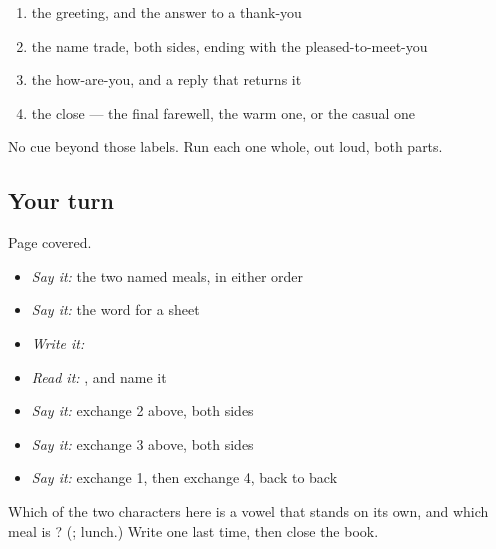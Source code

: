 \begin{enumerate}
\raggedright
  \item the greeting, and the answer to a thank-you
  \item the name trade, both sides, ending with the pleased-to-meet-you
  \item the how-are-you, and a reply that returns it
  \item the close — the final farewell, the warm one, or the casual one
\end{enumerate}

No cue beyond those labels. Run each one whole, out loud, both parts.

\subsection*{Your turn}
Page covered.

\begin{itemize}
\raggedright
  \item \emph{Say it:} the two named meals, in either order
  \item \emph{Say it:} the word for a sheet
  \item \emph{Write it:} \textbf{}
  \item \emph{Read it:} \textbf{}, and name it
  \item \emph{Say it:} exchange 2 above, both sides
  \item \emph{Say it:} exchange 3 above, both sides
  \item \emph{Say it:} exchange 1, then exchange 4, back to back
\end{itemize}

\begin{tcolorbox}[breakable,colback=teal!4,colframe=teal!35!black,title={Before you move on}]
Which of the two characters here is a vowel that stands on its own, and which meal is \textbf{  }? (\textbf{}; lunch.) Write \textbf{} one last time, then close the book.
\end{tcolorbox}
